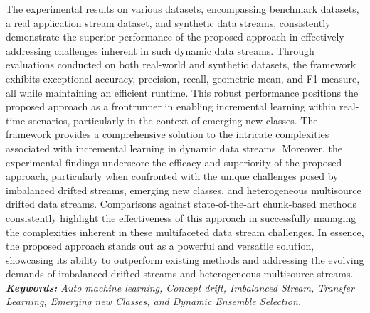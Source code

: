 \begin{alwayssingle}
    The experimental results on various datasets, encompassing benchmark datasets, a real application stream dataset, and synthetic data streams, consistently demonstrate the superior performance of the proposed approach in effectively addressing challenges inherent in such dynamic data streams. Through evaluations conducted on both real-world and synthetic datasets, the framework exhibits exceptional accuracy, precision, recall, geometric mean, and F1-measure, all while maintaining an efficient runtime.
    This robust performance positions the proposed approach as a frontrunner in enabling incremental learning within real-time scenarios, particularly in the context of emerging new classes. The framework provides a comprehensive solution to the intricate complexities associated with incremental learning in dynamic data streams. Moreover, the experimental findings underscore the efficacy and superiority of the proposed approach, particularly when confronted with the unique challenges posed by imbalanced drifted streams, emerging new classes, and heterogeneous multisource drifted data streams.
    Comparisons against state-of-the-art chunk-based methods consistently highlight the effectiveness of this approach in successfully managing the complexities inherent in these multifaceted data stream challenges. In essence, the proposed approach stands out as a powerful and versatile solution, showcasing its ability to outperform existing methods and addressing the evolving demands of imbalanced drifted streams and heterogeneous multisource streams.\\
    \emph{\textbf{Keywords:} Auto machine learning, Concept drift, Imbalanced Stream, Transfer Learning, Emerging new Classes, and Dynamic Ensemble Selection.}
    
\end{alwayssingle}




%
%



